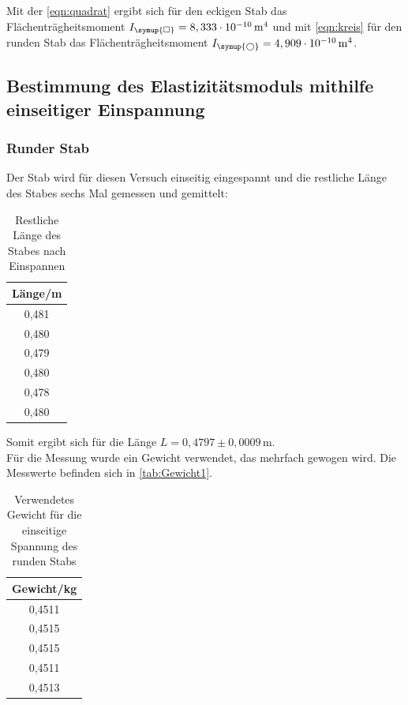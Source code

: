   Mit der \autoref{eqn:quadrat} ergibt sich für den eckigen Stab das Flächenträgheitsmoment $I_{\symup{\square}} = 8,333 \cdot 10^{-10} \, \mathrm{m^4}$ und mit \autoref{eqn:kreis} für den 
  runden Stab das Flächenträgheitsmoment $I_{\symup{\bigcirc}} = 4,909 \cdot 10^{-10} \, \mathrm{m^4}$.\\

\subsection{Bestimmung des Elastizitätsmoduls mithilfe einseitiger Einspannung}

\subsubsection{Runder Stab}
  Der Stab wird für diesen Versuch einseitig eingespannt und die restliche Länge des Stabes sechs Mal gemessen und gemittelt:

  \begin{table}
    \centering
    \caption{Restliche Länge des Stabes nach Einspannen}
    \label{tab:einseitig_runder_Laenge}
    \begin{tabular}{c}
      \toprule
      Länge/m \\
      \midrule
      0,481 \\
      0,480 \\
      0,479 \\
      0,480 \\
      0,478 \\
      0,480 \\
      \bottomrule
    \end{tabular}
  \end{table}

  Somit ergibt sich für die Länge $L = 0{,}4797 \pm 0,0009 \, \mathrm{m}$.\\

  Für die Messung wurde ein Gewicht verwendet, das mehrfach gewogen wird. Die Messwerte befinden sich in \autoref{tab:Gewicht1}.

  \begin{table}
    \centering
    \caption{Verwendetes Gewicht für die einseitige Spannung des runden Stabs}
    \label{tab:Gewicht1}
    \begin{tabular}{c}
      \toprule
      Gewicht/kg \\
      \midrule
      0,4511 \\
      0,4515 \\
      0,4515 \\
      0,4511 \\
      0,4513 \\
      \bottomrule
    \end{tabular}
  \end{table}

